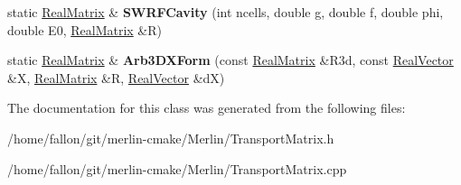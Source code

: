 \begin{DoxyCompactItemize}
static \hyperlink{classTLAS_1_1Matrix}{Real\+Matrix} \& {\bfseries S\+W\+R\+F\+Cavity} (int ncells, double g, double f, double phi, double E0, \hyperlink{classTLAS_1_1Matrix}{Real\+Matrix} \&R)
\item 
\mbox{\label{classTransportMatrix_a6b99b896af206f5303d29609b2d2e1b7}} 
static \hyperlink{classTLAS_1_1Matrix}{Real\+Matrix} \& {\bfseries Arb3\+D\+X\+Form} (const \hyperlink{classTLAS_1_1Matrix}{Real\+Matrix} \&R3d, const \hyperlink{classTLAS_1_1Vector}{Real\+Vector} \&X, \hyperlink{classTLAS_1_1Matrix}{Real\+Matrix} \&R, \hyperlink{classTLAS_1_1Vector}{Real\+Vector} \&dX)
\end{DoxyCompactItemize}


The documentation for this class was generated from the following files\+:\begin{DoxyCompactItemize}
\item 
/home/fallon/git/merlin-\/cmake/\+Merlin/Transport\+Matrix.\+h\item 
/home/fallon/git/merlin-\/cmake/\+Merlin/Transport\+Matrix.\+cpp\end{DoxyCompactItemize}
